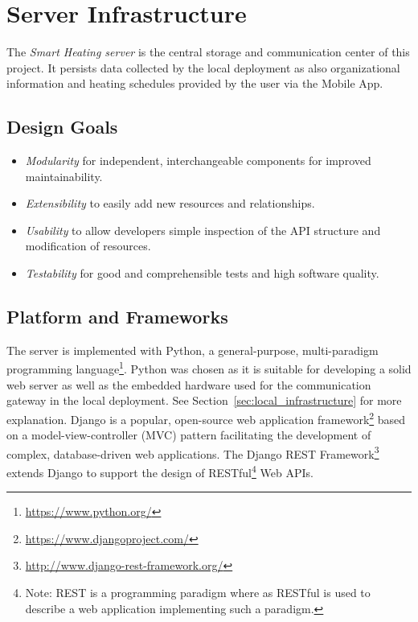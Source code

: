 
\section{Server Infrastructure}
\label{sec:server_infrastructure}

The \emph{Smart Heating server} is the central storage and communication center of this project.
It persists data collected by the local deployment as also organizational information and heating schedules provided by the user via the Mobile App.

\subsection{Design Goals}

\begin{itemize}
\item \emph{Modularity} for independent, interchangeable components for improved maintainability.
\item \emph{Extensibility} to easily add new resources and relationships.
\item \emph{Usability} to allow developers simple inspection of the API structure and modification of resources.
\item \emph{Testability} for good and comprehensible tests and high software quality.
\end{itemize}

\subsection{Platform and Frameworks}

The server is implemented with Python, a general-purpose, multi-paradigm programming language\footnote{\url{https://www.python.org/}}.
Python was chosen as it is suitable for developing a solid web server as well as the embedded hardware used for the communication gateway in the local deployment. See Section~\ref{sec:local_infrastructure} for more explanation.
Django is a popular, open-source web application framework\footnote{\url{https://www.djangoproject.com/}} based on a model-view-controller (MVC) pattern facilitating the development of complex, database-driven web applications.
The Django REST Framework\footnote{\url{http://www.django-rest-framework.org/}} extends Django to support the design of RESTful\footnote{Note: REST is a programming paradigm where as RESTful is used to describe a web application implementing such a paradigm.} Web APIs.

